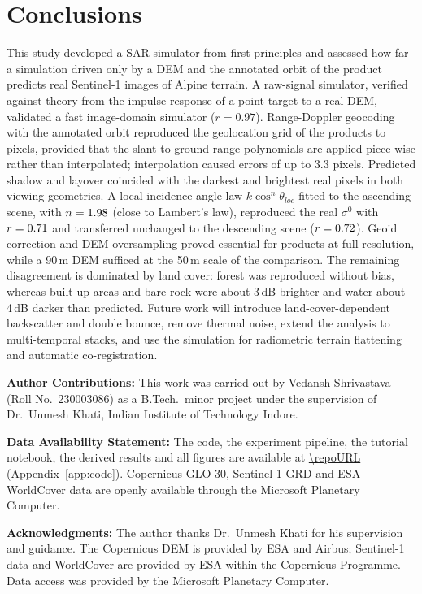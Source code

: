 \documentclass[10pt,a4paper]{article}
\newcommand{\sigz}{\sigma^0}
\begin{document}
\section{Conclusions}
\label{sec:conclusions}
This study developed a SAR simulator from first principles and assessed how far a simulation driven only by a DEM and the annotated orbit of the product predicts real Sentinel-1 images of Alpine terrain. A raw-signal simulator, verified against theory from the impulse response of a point target to a real DEM, validated a fast image-domain simulator ($r=0.97$). Range-Doppler geocoding with the annotated orbit reproduced the geolocation grid of the products to \geoDpixMax{} pixels, provided that the slant-to-ground-range polynomials are applied piece-wise rather than interpolated; interpolation caused errors of up to 3.3 pixels. Predicted shadow and layover coincided with the darkest and brightest real pixels in both viewing geometries. A local-incidence-angle law $k\cos^{n}\theta_{loc}$ fitted to the ascending scene, with $n=1.98$ (close to Lambert's law), reproduced the real $\sigz$ with $r=0.71$ and transferred unchanged to the descending scene ($r=0.72$). Geoid correction and DEM oversampling proved essential for products at full resolution, while a 90\,m DEM sufficed at the 50\,m scale of the comparison. The remaining disagreement is dominated by land cover: forest was reproduced without bias, whereas built-up areas and bare rock were about 3\,dB brighter and water about 4\,dB darker than predicted. Future work will introduce land-cover-dependent backscatter and double bounce, remove thermal noise, extend the analysis to multi-temporal stacks, and use the simulation for radiometric terrain flattening and automatic co-registration.

\vspace{8pt}
{\small
\noindent\textbf{Author Contributions:} This work was carried out by Vedansh Shrivastava (Roll No.\ 230003086) as a B.Tech.\ minor project under the supervision of Dr.\ Unmesh Khati, Indian Institute of Technology Indore.

\vspace{4pt}\noindent\textbf{Data Availability Statement:} The code, the experiment pipeline, the tutorial notebook, the derived results and all figures are available at \url{\repoURL} (Appendix~\ref{app:code}). Copernicus GLO-30, Sentinel-1 GRD and ESA WorldCover data are openly available through the Microsoft Planetary Computer.

\vspace{4pt}\noindent\textbf{Acknowledgments:} The author thanks Dr.\ Unmesh Khati for his supervision and guidance. The Copernicus DEM is provided by ESA and Airbus; Sentinel-1 data and WorldCover are provided by ESA within the Copernicus Programme. Data access was provided by the Microsoft Planetary Computer.
\par}
\end{document}
